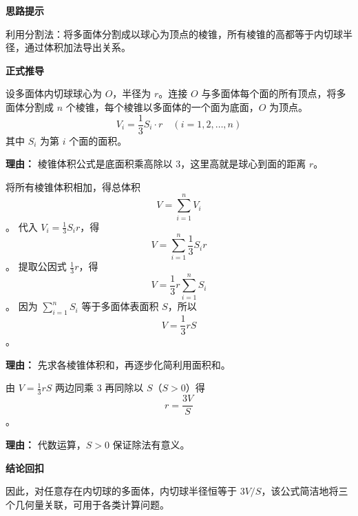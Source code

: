 \begin{proofbox}
	\textbf{\textcolor{CProof}{思路提示}}

	利用分割法：将多面体分割成以球心为顶点的棱锥，所有棱锥的高都等于内切球半径，通过体积加法导出关系。

	\medskip
	\textbf{\textcolor{CProof}{正式推导}}
	\begin{description}[style=nextline, leftmargin=2.8em, labelsep=0.5em, itemsep=0.55em]
		\item[\textbf{步骤一（分割棱锥）：}] 设多面体内切球球心为 $O$，半径为 $r$。连接 $O$ 与多面体每个面的所有顶点，将多面体分割成 $n$ 个棱锥，每个棱锥以多面体的一个面为底面，$O$ 为顶点。
			\[
				V_i = \frac{1}{3} S_i \cdot r \quad (i=1,2,\dots,n)
			\]
			其中 $S_i$ 为第 $i$ 个面的面积。
			\par\textbf{理由：} 棱锥体积公式是底面积乘高除以 $3$，这里高就是球心到面的距离 $r$。

		\item[\textbf{步骤二（体积求和）：}] 将所有棱锥体积相加，得总体积
			\[
				V = \sum_{i=1}^{n} V_i
			\]。
			代入 $V_i = \frac{1}{3} S_i r$，得
			\[
				V = \sum_{i=1}^{n} \frac{1}{3} S_i r
			\]。
			提取公因式 $\frac{1}{3} r$，得
			\[
				V = \frac{1}{3} r \sum_{i=1}^{n} S_i
			\]。
			因为 $\sum_{i=1}^{n} S_i$ 等于多面体表面积 $S$，所以
			\[
				V = \frac{1}{3} r S
			\]。
			\par\textbf{理由：} 先求各棱锥体积和，再逐步化简利用面积和。

		\item[\textbf{步骤三（解出半径）：}] 由 $V = \frac{1}{3} r S$ 两边同乘 $3$ 再同除以 $S$（$S>0$）得
			\[
				r = \frac{3V}{S}
			\]。
			\par\textbf{理由：} 代数运算，$S>0$ 保证除法有意义。
	\end{description}

	\medskip
	\textbf{\textcolor{CProof}{结论回扣}}

	因此，对任意存在内切球的多面体，内切球半径恒等于 $3V/S$，该公式简洁地将三个几何量关联，可用于各类计算问题。
\end{proofbox}
